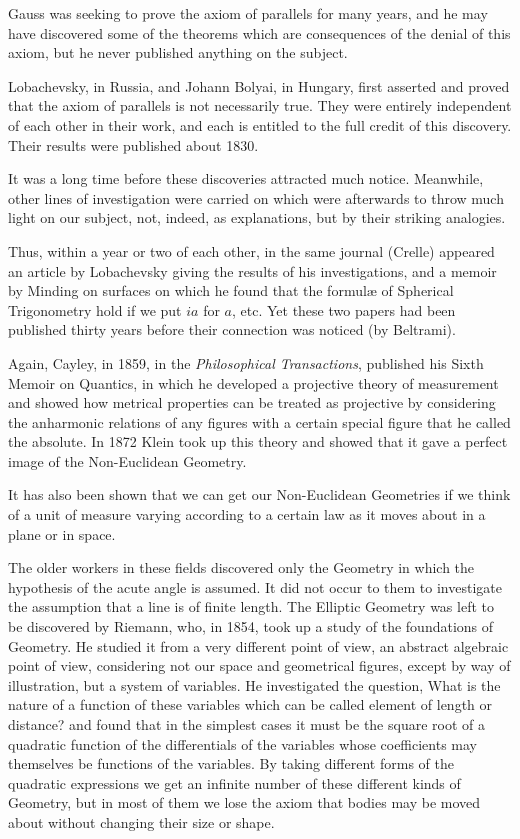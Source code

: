 Gauss was seeking to prove the axiom of parallels for many years,
and he may have discovered some of the theorems which are
consequences of the denial of this axiom, but he never published
anything on the subject.

Lobachevsky, in Russia, and Johann Bolyai, in Hungary, first
asserted and proved that the axiom of parallels is not necessarily
true. They were entirely independent of each other in their work,
and each is entitled to the full credit of this discovery. Their
results were published about 1830.

It was a long time before these discoveries attracted much notice.
Meanwhile, other lines of investigation were carried on which were
afterwards to throw much light on our subject, not, indeed, as
explanations, but by their striking analogies.

Thus, within a year or two of each other, in the same journal
(Crelle) appeared an article by Lobachevsky giving the results of
his investigations, and a memoir by Minding on surfaces on which he
found that the formulæ of Spherical Trigonometry hold if we put $ia$
for $a$, etc. Yet these two papers had been published thirty years
before their connection was noticed (by Beltrami).\label{histnote}

Again, Cayley, in 1859, in the \emph{Philosophical Transactions},
published his Sixth Memoir on Quantics, in which he developed a
projective theory of measurement and showed how metrical properties
can be treated as projective by considering the anharmonic relations
of any figures with a certain special figure that he called the
absolute. In 1872 Klein took up this theory and showed that it gave
a perfect image of the Non-Euclidean Geometry.

It has also been shown that we can get our Non-Euclidean Geometries
if we think of a unit of measure varying according to a certain law
as it moves about in a plane or in space.

The older workers in these fields discovered only the Geometry in
which the hypothesis of the acute angle is assumed. It did not occur
to them to investigate the assumption that a line is of finite
length. The Elliptic Geometry was left to be discovered by Riemann,
who, in 1854, took up a study of the foundations of Geometry. He
studied it from a very different point of view, an abstract
algebraic point of view, considering not our space and geometrical
figures, except by way of illustration, but a system of variables.
He investigated the question, What is the nature of a function of
these variables which can be called element of length or distance?
and found that in the simplest cases it must be the square root of a
quadratic function of the differentials of the variables whose
coefficients may themselves be functions of the variables. By taking
different forms of the quadratic expressions we get an infinite
number of these different kinds of Geometry, but in most of them we
lose the axiom that bodies may be moved about without changing their
size or shape.

